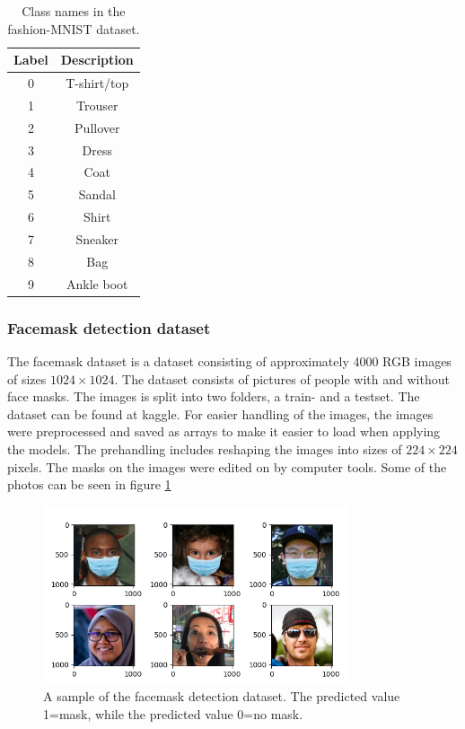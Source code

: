 \documentclass[../main.tex]{subfiles}
\begin{document}
\begin{table}[htb]
    \centering
    \caption{Class names in the fashion-MNIST dataset. }
    \begin{tabular}{c c}
    \toprule
    Label    & Description  \\
    \midrule
    0 & T-shirt/top \\
    1 & Trouser \\
    2 & Pullover \\
    3 & Dress \\
    4 & Coat \\
    5 & Sandal \\
    6 & Shirt \\
    7 & Sneaker \\
    8 & Bag \\
    9 & Ankle boot \\
    \bottomrule
    \end{tabular}
    \label{tab:labels}
\end{table}

\subsubsection{Facemask detection dataset}
The facemask dataset is a dataset consisting of approximately 4000 RGB images of sizes \ensuremath{1024\times1024}. The dataset consists of pictures of people with and without face masks. The images is split into two folders, a train- and a testset. The dataset can be found at kaggle\cite{facemask_dataset}. For easier handling of the images, the images were preprocessed and saved as arrays to make it easier to load when applying the models. The prehandling includes reshaping the images into sizes of \ensuremath{224\times224} pixels. The masks on the images were edited on by computer tools. Some of the photos can be seen in figure \ref{fig:ex_facemask_set}

\begin{figure}[H]
    \centering
    \includegraphics[width=0.8\textwidth]{doc/assets/face_mask_samples.png}
    \caption{A sample of the facemask detection dataset. The predicted value 1=mask, while the predicted value 0=no mask.}
    \label{fig:ex_facemask_set}
\end{figure}
\end{document}
